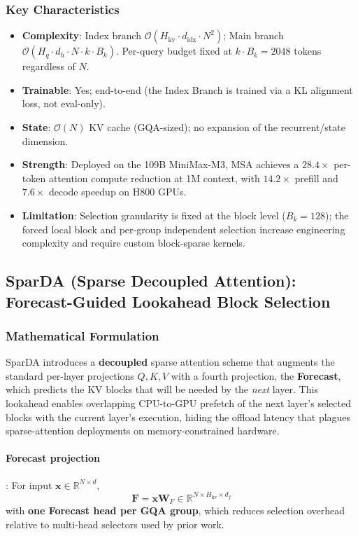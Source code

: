\subsubsection{Key Characteristics}

\begin{itemize}[leftmargin=*]
    \item \textbf{Complexity}: Index branch $\mathcal{O}(H_{\text{kv}} \cdot d_{\text{idx}} \cdot N^2)$; Main branch $\mathcal{O}(H_q \cdot d_h \cdot N \cdot k \cdot B_k)$. Per-query budget fixed at $k \cdot B_k = 2048$ tokens regardless of $N$.
    \item \textbf{Trainable}: Yes; end-to-end (the Index Branch is trained via a KL alignment loss, not eval-only).
    \item \textbf{State}: $\mathcal{O}(N)$ KV cache (GQA-sized); no expansion of the recurrent/state dimension.
    \item \textbf{Strength}: Deployed on the 109B MiniMax-M3, MSA achieves a $28.4\times$ per-token attention compute reduction at 1M context, with $14.2\times$ prefill and $7.6\times$ decode speedup on H800 GPUs.
    \item \textbf{Limitation}: Selection granularity is fixed at the block level ($B_k = 128$); the forced local block and per-group independent selection increase engineering complexity and require custom block-sparse kernels.
\end{itemize}

\subsection{SparDA (Sparse Decoupled Attention): Forecast-Guided Lookahead Block Selection}

\subsubsection{Mathematical Formulation}

SparDA \citep{fu_sparda_2026} introduces a \textbf{decoupled} sparse attention scheme that augments the standard per-layer projections $Q, K, V$ with a fourth projection, the \textbf{Forecast}, which predicts the KV blocks that will be needed by the \emph{next} layer. This lookahead enables overlapping CPU-to-GPU prefetch of the next layer's selected blocks with the current layer's execution, hiding the offload latency that plagues sparse-attention deployments on memory-constrained hardware.

\paragraph{Forecast projection}: For input $\mathbf{x} \in \mathbb{R}^{N \times d}$,
\[
\mathbf{F} = \mathbf{x} \mathbf{W}_F \in \mathbb{R}^{N \times H_{\text{kv}} \times d_f}
\]
with \textbf{one Forecast head per GQA group}, which reduces selection overhead relative to multi-head selectors used by prior work.


